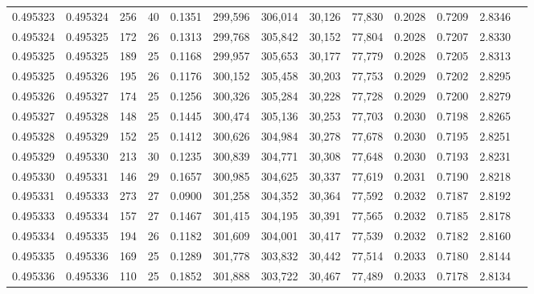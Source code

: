 \begin{tabular}{rrrrrrrrrrrrr}
0.495323 & 0.495324 & 256 &  40 &                                     0.1351 & 299,596 & 306,014 &  30,126 &  77,830 & 0.2028 & 0.7209 & 2.8346 \\
0.495324 & 0.495325 & 172 &  26 &                                     0.1313 & 299,768 & 305,842 &  30,152 &  77,804 & 0.2028 & 0.7207 & 2.8330 \\
0.495325 & 0.495325 & 189 &  25 &                                     0.1168 & 299,957 & 305,653 &  30,177 &  77,779 & 0.2028 & 0.7205 & 2.8313 \\
0.495325 & 0.495326 & 195 &  26 &                                     0.1176 & 300,152 & 305,458 &  30,203 &  77,753 & 0.2029 & 0.7202 & 2.8295 \\
0.495326 & 0.495327 & 174 &  25 &                                     0.1256 & 300,326 & 305,284 &  30,228 &  77,728 & 0.2029 & 0.7200 & 2.8279 \\
0.495327 & 0.495328 & 148 &  25 &                                     0.1445 & 300,474 & 305,136 &  30,253 &  77,703 & 0.2030 & 0.7198 & 2.8265 \\
0.495328 & 0.495329 & 152 &  25 &                                     0.1412 & 300,626 & 304,984 &  30,278 &  77,678 & 0.2030 & 0.7195 & 2.8251 \\
0.495329 & 0.495330 & 213 &  30 &                                     0.1235 & 300,839 & 304,771 &  30,308 &  77,648 & 0.2030 & 0.7193 & 2.8231 \\
0.495330 & 0.495331 & 146 &  29 &                                     0.1657 & 300,985 & 304,625 &  30,337 &  77,619 & 0.2031 & 0.7190 & 2.8218 \\
0.495331 & 0.495333 & 273 &  27 &                                     0.0900 & 301,258 & 304,352 &  30,364 &  77,592 & 0.2032 & 0.7187 & 2.8192 \\
0.495333 & 0.495334 & 157 &  27 &                                     0.1467 & 301,415 & 304,195 &  30,391 &  77,565 & 0.2032 & 0.7185 & 2.8178 \\
0.495334 & 0.495335 & 194 &  26 &                                     0.1182 & 301,609 & 304,001 &  30,417 &  77,539 & 0.2032 & 0.7182 & 2.8160 \\
0.495335 & 0.495336 & 169 &  25 &                                     0.1289 & 301,778 & 303,832 &  30,442 &  77,514 & 0.2033 & 0.7180 & 2.8144 \\
0.495336 & 0.495336 & 110 &  25 &                                     0.1852 & 301,888 & 303,722 &  30,467 &  77,489 & 0.2033 & 0.7178 & 2.8134 \\

\end{tabular}
